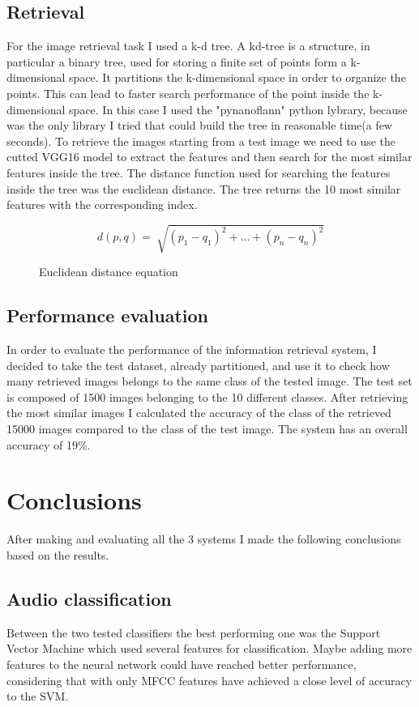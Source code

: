 \documentclass[12pt,journal,compsoc]{IEEEtran}
\begin{document}
\subsection{Retrieval}
For the image retrieval task I used a k-d tree\cite{Kdtree}. A kd-tree is a structure, in particular a binary tree, used for storing a finite set of points form a k-dimensional space. It partitions the k-dimensional space in order to organize the points. This can lead to faster search performance of the point inside the k-dimensional space.
In this case I used the "pynanoflann"\cite{PyNanoflann} python lybrary, because was the only library I tried that could build the tree in reasonable time(a few seconds).
To retrieve the images starting from a test image we need to use the cutted VGG16 model to extract the features and then search for the most similar features inside the tree. The distance function used for searching the features inside the tree was the euclidean distance. The tree returns the 10 most similar features with the corresponding index.

\begin{figure}[H]
	 \[d(p, q) = \sqrt[]{(p_1-q_1)^2 +...+(p_n-q_n)^2} \]
	 \caption{Euclidean distance equation}

\end{figure}
\subsection{Performance evaluation}
In order to evaluate the performance of the information retrieval system, I decided to take the test dataset, already partitioned, and use it to check how many retrieved images belongs to the same class of the tested image.
The test set is composed of 1500 images belonging to the 10 different classes. After retrieving the most similar images I calculated the accuracy of the class of the retrieved 15000 images compared to the class of the test image. The system has an overall accuracy of 19\%.

\section{Conclusions}
After making and evaluating all the 3 systems I made the following conclusions based on the results.
\subsection{Audio classification}
Between the two tested classifiers the best performing one was the Support Vector Machine which used several features for classification. Maybe adding more features to the neural network could have reached better performance, considering that with only MFCC features have achieved a close level of accuracy to the SVM.
\end{document}
